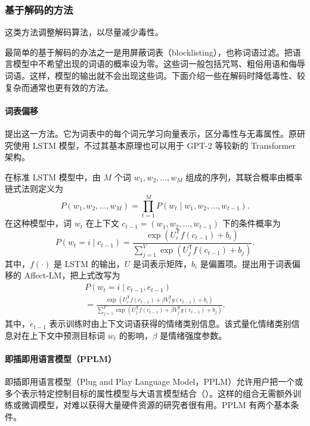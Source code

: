 \subsubsection{基于解码的方法}
这类方法调整解码算法，以尽量减少毒性。

\begin{practicaltip}
最简单的基于解码的办法之一是用屏蔽词表（blocklisting），也称词语过滤。把语言模型中不希望出现的词语的概率设为零。这些词一般包括咒骂、粗俗用语和侮辱词语。这样，模型的输出就不会出现这些词。下面介绍一些在解码时降低毒性、较复杂而通常也更有效的方法。
\end{practicaltip}

\paragraph*{词表偏移}
提出这一方法。它为词表中的每个词元学习向量表示，区分毒性与无毒属性。原研究使用 LSTM 模型，不过其基本原理也可以用于 GPT-2 等较新的 Transformer 架构。

在标准 LSTM 模型中，由 $M$ 个词 $w_1,w_2,\ldots,w_M$ 组成的序列，其联合概率由概率链式法则定义为
\begin{equation}
P(w_1,w_2,\ldots,w_M)
=\prod_{t=1}^{M}P(w_t\mid w_1,w_2,\ldots,w_{t-1}).
\label{eq:ch06-lstm-joint}
\end{equation}
在这种模型中，词 $w_t$ 在上下文 $c_{t-1}=(w_1,w_2,\ldots,w_{t-1})$ 下的条件概率为
\begin{equation}
P(w_t=i\mid c_{t-1})
=\frac{\exp(U_i^{\mathsf T}f(c_{t-1})+b_i)}
 {\sum_{j=1}^{V}\exp(U_j^{\mathsf T}f(c_{t-1})+b_j)}.
\label{eq:ch06-lstm-conditional}
\end{equation}
其中，$f(\cdot)$ 是 LSTM 的输出，$U$ 是词表示矩阵，$b_i$ 是偏置项。提出用于词表偏移的 Affect-LM，把上式改写为
\begin{multline}
P(w_t=i\mid c_{t-1},e_{t-1})\\
=\frac{\exp(U_i^{\mathsf T}f(c_{t-1})+\beta V_i^{\mathsf T}g(e_{t-1})+b_i)}
 {\sum_{j=1}^{V}\exp(U_j^{\mathsf T}f(c_{t-1})+\beta V_j^{\mathsf T}g(e_{t-1})+b_j)}.
\label{eq:ch06-affect-lm}
\end{multline}
其中，$e_{t-1}$ 表示训练时由上下文词语获得的情绪类别信息。该式量化情绪类别信息对在上下文中预测目标词 $w_t$ 的影响，$\beta$ 是情绪强度参数。

\paragraph*{即插即用语言模型（PPLM）}
即插即用语言模型（Plug and Play Language Model，PPLM）允许用户把一个或多个表示特定控制目标的属性模型与大语言模型结合（）。这样的组合无需额外训练或微调模型，对难以获得大量硬件资源的研究者很有用。PPLM 有两个基本条件。

